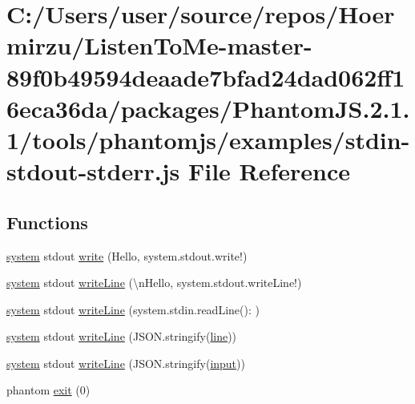 \hypertarget{stdin-stdout-stderr_8js}{}\section{C\+:/\+Users/user/source/repos/\+Hoermirzu/\+Listen\+To\+Me-\/master-\/89f0b49594deaade7bfad24dad062ff16eca36da/packages/\+Phantom\+JS.2.1.1/tools/phantomjs/examples/stdin-\/stdout-\/stderr.js File Reference}
\label{stdin-stdout-stderr_8js}
\subsection*{Functions}
\begin{DoxyCompactItemize}
\item 
\hyperlink{stdin-stdout-stderr_8js_acdb77dc97eb44e91baaadd41d9d078fc}{system} stdout \hyperlink{stdin-stdout-stderr_8js_a0ed65609278c1d7610cacf101e139f9c}{write} (\textquotesingle{}Hello, system.\+stdout.\+write!\textquotesingle{})
\item 
\hyperlink{stdin-stdout-stderr_8js_acdb77dc97eb44e91baaadd41d9d078fc}{system} stdout \hyperlink{stdin-stdout-stderr_8js_a4e770b0a19396b54fbd80fa86c7cb69f}{write\+Line} (\textquotesingle{}\textbackslash{}n\+Hello, system.\+stdout.\+write\+Line!\textquotesingle{})
\item 
\hyperlink{stdin-stdout-stderr_8js_acdb77dc97eb44e91baaadd41d9d078fc}{system} stdout \hyperlink{stdin-stdout-stderr_8js_a6820d00b96695fd9f317bd0503221b17}{write\+Line} (\textquotesingle{}system.\+stdin.\+read\+Line()\+: \textquotesingle{})
\item 
\hyperlink{stdin-stdout-stderr_8js_acdb77dc97eb44e91baaadd41d9d078fc}{system} stdout \hyperlink{stdin-stdout-stderr_8js_af46d50054b17c915a839a6a0966c9543}{write\+Line} (J\+S\+O\+N.\+stringify(\hyperlink{stdin-stdout-stderr_8js_ae379b8c31475b8ad7712b7ead5ce1173}{line}))
\item 
\hyperlink{stdin-stdout-stderr_8js_acdb77dc97eb44e91baaadd41d9d078fc}{system} stdout \hyperlink{stdin-stdout-stderr_8js_a0c6261fef71ccd1fa395023dc629767c}{write\+Line} (J\+S\+O\+N.\+stringify(\hyperlink{stdin-stdout-stderr_8js_a07a2aabd64594dc36dd810cad2669deb}{input}))
\item 
phantom \hyperlink{stdin-stdout-stderr_8js_a593a31c66f00c1621ea02a92b8ca2cf4}{exit} (0)
\end{DoxyCompactItemize}
